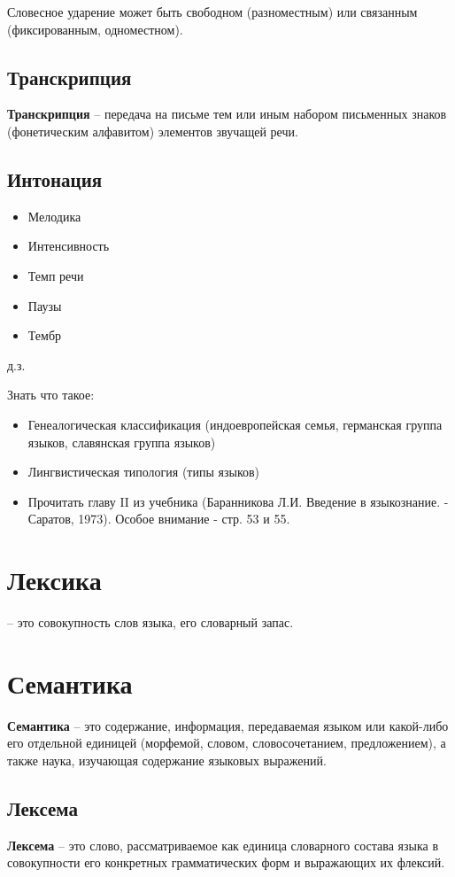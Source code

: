 \documentclass{article}
\begin{document}
Словесное ударение может быть свободном (разноместным) или связанным 
(фиксированным, одноместном).

\subsection{Транскрипция}
\textbf{Транскрипция} -- передача на письме тем или иным набором 
письменных знаков (фонетическим алфавитом) элементов звучащей речи.

\subsection{Интонация}
\begin{itemize}
    \item Мелодика
    \item Интенсивность
    \item Темп речи
    \item Паузы
    \item Тембр
\end{itemize}

д.з.

Знать что такое: 
\begin{itemize}
    \item Генеалогическая классификация (индоевропейская семья, 
    германская группа языков, славянская группа языков)
    \item Лингвистическая типология (типы языков)
    \item Прочитать главу II из учебника (Баранникова Л.И. Введение 
    в языкознание. - Саратов, 1973). Особое внимание - стр. 53 и 55.
\end{itemize}

\section{Лексика}
-- это совокупность слов языка, его словарный запас.

\section{Семантика}
\textbf{Семантика} -- это содержание, информация, передаваемая языком или какой-либо его
отдельной единицей (морфемой, словом, словосочетанием, предложением),
а также наука, изучающая содержание языковых выражений.

\subsection{Лексема}
\textbf{Лексема} -- это слово, рассматриваемое как единица словарного состава языка
в совокупности его конкретных грамматических форм и выражающих их флексий.
\end{document}
